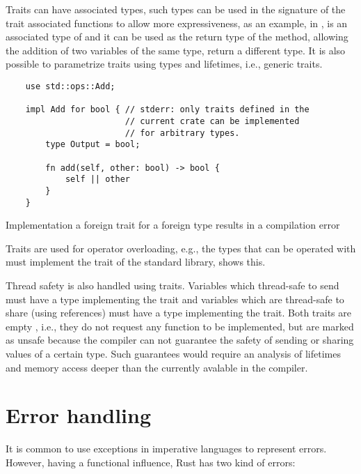 Traits can have associated types, such types can be used in the signature of the
trait associated functions to allow more expressiveness, as an example, in
,  is an associated type of
 and it can be used as the return type of the  method,
allowing the addition of two variables of the same type, return a different
type. It is also possible to parametrize traits using types and lifetimes, i.e.,
generic traits.

\begin{listing}[h]
	\begin{verbatim}
    use std::ops::Add;

    impl Add for bool { // stderr: only traits defined in the
                        // current crate can be implemented 
                        // for arbitrary types.
        type Output = bool;
        
        fn add(self, other: bool) -> bool {
            self || other
        }
    }
    \end{verbatim}
  \caption{Implementation a foreign trait for a foreign type results in a compilation error}
  \label{lst:foreign_trait_foreign_impl}
\end{listing}

Traits are used for operator overloading, e.g., the types that can be operated
with \inrust{+} must implement the  trait of the standard library,
 shows this. 

Thread safety is also handled using traits. Variables which thread-safe to send
must have a type implementing the  trait and variables which are
thread-safe to share (using references) must have a type implementing the
 trait. Both traits are empty , i.e., they do not request any
function to be implemented, but are marked as unsafe because the compiler can
not guarantee the safety of sending or sharing values of a certain type. Such
guarantees would require an analysis of lifetimes and memory access deeper than
the currently avalable in the compiler.

\section{Error handling}

It is common to use exceptions in imperative languages to represent errors.
However, having a functional influence, Rust has two kind of errors: 

